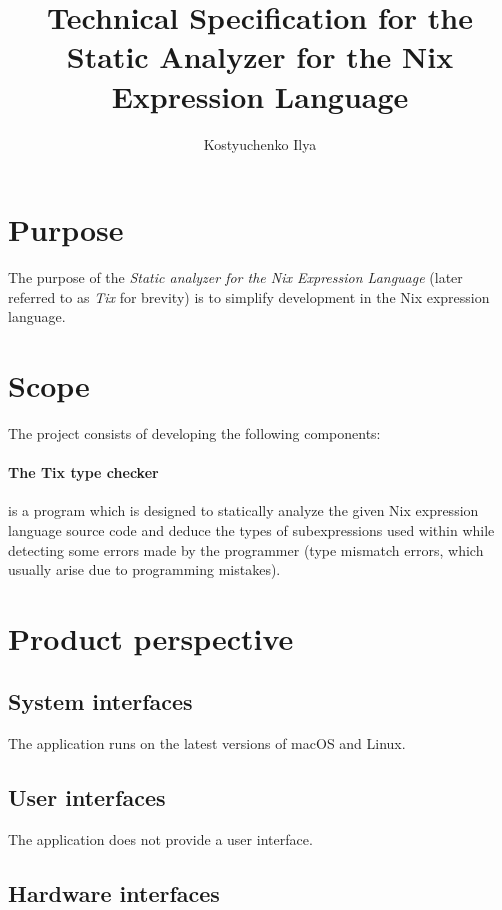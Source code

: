 \documentclass[12pt]{article}
\title{Technical Specification for the Static Analyzer for the Nix Expression Language}
\author{Kostyuchenko Ilya}
\date{}
\begin{document}
\maketitle

\newpage

\tableofcontents

\newpage

\section{Purpose}

The purpose of the \emph{Static analyzer for the Nix Expression Language} (later referred to as \emph{Tix} for brevity) is to simplify development in the Nix expression language.

\section{Scope}

The project consists of developing the following components:

\paragraph{The Tix type checker} is a program which is designed to statically analyze the given Nix expression language source code and deduce the types of subexpressions used within while detecting some errors made by the programmer (type mismatch errors, which usually arise due to programming mistakes).

\section{Product perspective}

\subsection{System interfaces}

The application runs on the latest versions of macOS and Linux.

\subsection{User interfaces}

The application does not provide a user interface.

\subsection{Hardware interfaces}
\end{document}
